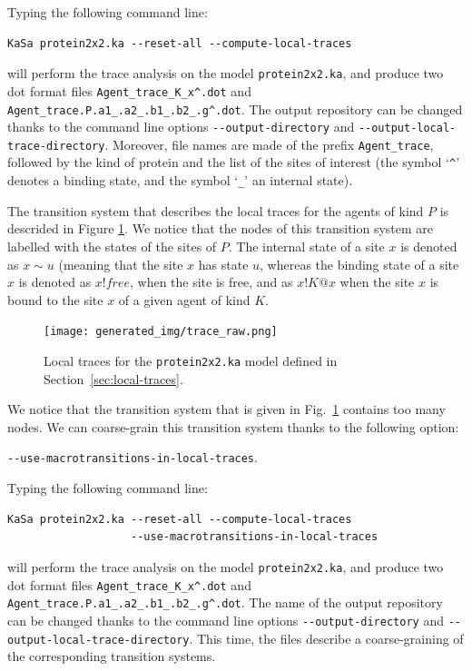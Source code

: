 \documentclass[11pt]{book}
\def\ttt#1{\texttt{#1}}
\begin{document}
Typing the following command line:

\begin{verbatim}
KaSa protein2x2.ka --reset-all --compute-local-traces
\end{verbatim}

will perform the trace analysis on the model \texttt{protein2x2.ka}, and produce
two dot format files \texttt{Agent\_trace\_K\_x\string^.dot} and \texttt{Agent\_trace.P.a1\_.a2\_.b1\_.b2\_.g\string^.dot}. The  output repository can be changed thanks to the command line options \texttt{-{}-output-directory} and \texttt{-{}-output-local-trace-directory}. Moreover, file names are made of the prefix \texttt{Agent\_trace}, followed by  the kind of protein and the list of the sites of interest (the symbol `\texttt{\string^}' denotes a binding state, and the symbol `\texttt{\_}' an internal state).

The transition system that describes the local traces for the agents of kind $P$ is descrided in Figure \ref{fig:trace-raw}. We notice that the nodes of this transition system are labelled with the states of the sites of $P$. The internal state of a site $x$ is denoted as $x{\sim}u$ (meaning that the site $x$ has state $u$, whereas the binding state of a site $x$ is denoted as $x!\textit{free}$, when the site is free, and as $x!K@x$ when the site $x$ is bound to the site $x$ of a given agent of kind $K$.

\begin{figure}[htbp]
\centering
\texttt{[image: generated\_img/trace\_raw.png]}
\caption{Local traces for the \ttt{protein2x2.ka} model defined in Section~\ref{sec:local-traces}.}
\label{fig:trace-raw}
\end{figure}

We notice that the transition system that is given in Fig.~\ref{fig:trace-raw}  contains too many nodes. We can coarse-grain this transition system thanks to the following option:
\begin{center}
\texttt{-{}-use-macrotransitions-in-local-traces}.
\end{center}
Typing the following command line:

\begin{verbatim}
KaSa protein2x2.ka --reset-all --compute-local-traces
                   --use-macrotransitions-in-local-traces
\end{verbatim}

will perform the trace analysis on the model \texttt{protein2x2.ka}, and produce
two dot format files \texttt{Agent\_trace\_K\_x\string^.dot} and \texttt{Agent\_trace.P.a1\_.a2\_.b1\_.b2\_.g\string^.dot}. The name of the output repository can be changed thanks to the command line options \texttt{-{}-output-directory} and \texttt{-{}-output-local-trace-directory}.
This time, the files describe a coarse-graining of the corresponding transition systems.
\end{document}
